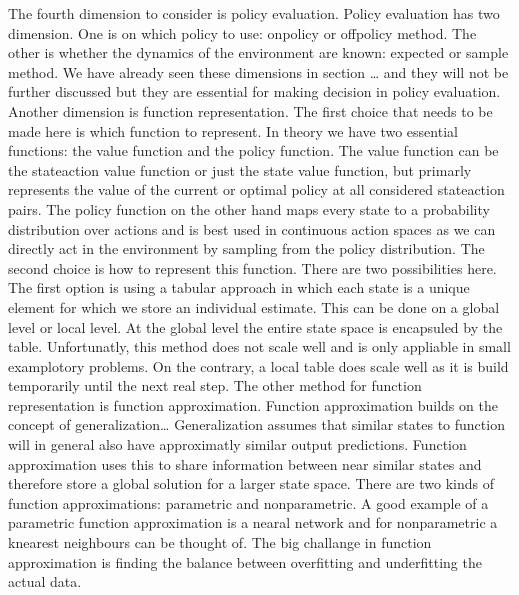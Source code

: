 \documentclass[letterpaper,10pt,english]{jupyterBook}
\begin{document}
\sphinxAtStartPar
The fourth dimension to consider is policy evaluation. Policy evaluation has two dimension. One is on which policy to use: on\sphinxhyphen{}policy or off\sphinxhyphen{}policy method. The other is whether the dynamics of the environment are known: expected or sample method. We have already seen these dimensions in section … and they will not be further discussed but they are essential for making decision in policy evaluation. Another dimension is function representation. The first choice that needs to be made here is which function to represent. In theory we have two essential functions: the value function and the policy function. The value function can be the state\sphinxhyphen{}action value function or just the state value function, but primarly represents the value of the current or optimal policy at all considered state\sphinxhyphen{}action pairs. The policy function on the other hand maps every state to a probability distribution over actions and is best used in continuous action spaces as we can directly act in the environment by sampling from the policy distribution. The second choice is how to represent this function. There are two possibilities here. The first option is using a tabular approach in which each state is a unique element for which we store an individual estimate.  This can be done on a global level or local level. At the global level the entire state space is encapsuled by the table. Unfortunatly, this method does not scale well and is only appliable in small examplotory problems. On the contrary, a local table does scale well as it is build temporarily until the next real step. The other method for function  representation is function approximation. Function approximation builds on the concept of generalization… Generalization assumes that similar states to function will in general also have approximatly similar output predictions. Function approximation uses this to share information between near similar states and therefore store a global solution for a larger state space. There are two kinds of function approximations: parametric and non\sphinxhyphen{}parametric. A good example of a parametric function approximation is a nearal network and for non\sphinxhyphen{}parametric a k\sphinxhyphen{}nearest neighbours can be thought of. The big challange in function approximation is finding the balance between overfitting and underfitting the actual data.
\end{document}
